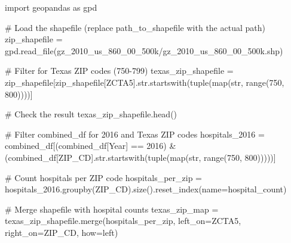 \documentclass[
  letterpaper,
  DIV=11,
  numbers=noendperiod]{scrartcl}
\newenvironment{Shaded}{\begin{snugshade}}{\end{snugshade}}
\newcommand{\BuiltInTok}[1]{\textcolor[rgb]{0.00,0.23,0.31}{#1}}
\newcommand{\CommentTok}[1]{\textcolor[rgb]{0.37,0.37,0.37}{#1}}
\newcommand{\DecValTok}[1]{\textcolor[rgb]{0.68,0.00,0.00}{#1}}
\newcommand{\ImportTok}[1]{\textcolor[rgb]{0.00,0.46,0.62}{#1}}
\newcommand{\NormalTok}[1]{\textcolor[rgb]{0.00,0.23,0.31}{#1}}
\newcommand{\OperatorTok}[1]{\textcolor[rgb]{0.37,0.37,0.37}{#1}}
\newcommand{\StringTok}[1]{\textcolor[rgb]{0.13,0.47,0.30}{#1}}
\begin{document}
\begin{Shaded}
\begin{Highlighting}[]
\ImportTok{import}\NormalTok{ geopandas }\ImportTok{as}\NormalTok{ gpd}

\CommentTok{\# Load the shapefile (replace \textquotesingle{}path\_to\_shapefile\textquotesingle{} with the actual path)}
\NormalTok{zip\_shapefile }\OperatorTok{=}\NormalTok{ gpd.read\_file(}\StringTok{\textquotesingle{}gz\_2010\_us\_860\_00\_500k/gz\_2010\_us\_860\_00\_500k.shp\textquotesingle{}}\NormalTok{)}

\CommentTok{\# Filter for Texas ZIP codes (750{-}799)}
\NormalTok{texas\_zip\_shapefile }\OperatorTok{=}\NormalTok{ zip\_shapefile[zip\_shapefile[}\StringTok{\textquotesingle{}ZCTA5\textquotesingle{}}\NormalTok{].}\BuiltInTok{str}\NormalTok{.startswith(}\BuiltInTok{tuple}\NormalTok{(}\BuiltInTok{map}\NormalTok{(}\BuiltInTok{str}\NormalTok{, }\BuiltInTok{range}\NormalTok{(}\DecValTok{750}\NormalTok{, }\DecValTok{800}\NormalTok{))))]}

\CommentTok{\# Check the result}
\NormalTok{texas\_zip\_shapefile.head()}

\CommentTok{\# Filter combined\_df for 2016 and Texas ZIP codes}
\NormalTok{hospitals\_2016 }\OperatorTok{=}\NormalTok{ combined\_df[(combined\_df[}\StringTok{\textquotesingle{}Year\textquotesingle{}}\NormalTok{] }\OperatorTok{==} \DecValTok{2016}\NormalTok{) }\OperatorTok{\&} 
\NormalTok{                             (combined\_df[}\StringTok{\textquotesingle{}ZIP\_CD\textquotesingle{}}\NormalTok{].}\BuiltInTok{str}\NormalTok{.startswith(}\BuiltInTok{tuple}\NormalTok{(}\BuiltInTok{map}\NormalTok{(}\BuiltInTok{str}\NormalTok{, }\BuiltInTok{range}\NormalTok{(}\DecValTok{750}\NormalTok{, }\DecValTok{800}\NormalTok{)))))]}

\CommentTok{\# Count hospitals per ZIP code}
\NormalTok{hospitals\_per\_zip }\OperatorTok{=}\NormalTok{ hospitals\_2016.groupby(}\StringTok{\textquotesingle{}ZIP\_CD\textquotesingle{}}\NormalTok{).size().reset\_index(name}\OperatorTok{=}\StringTok{\textquotesingle{}hospital\_count\textquotesingle{}}\NormalTok{)}

\CommentTok{\# Merge shapefile with hospital counts}
\NormalTok{texas\_zip\_map }\OperatorTok{=}\NormalTok{ texas\_zip\_shapefile.merge(hospitals\_per\_zip, left\_on}\OperatorTok{=}\StringTok{\textquotesingle{}ZCTA5\textquotesingle{}}\NormalTok{, right\_on}\OperatorTok{=}\StringTok{\textquotesingle{}ZIP\_CD\textquotesingle{}}\NormalTok{, how}\OperatorTok{=}\StringTok{\textquotesingle{}left\textquotesingle{}}\NormalTok{)}


\end{Highlighting}
\end{Shaded}
\end{document}
